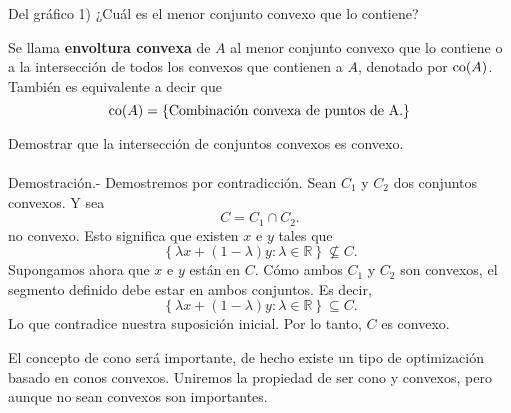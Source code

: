 \begin{paracol}{2}
Del gráfico 1) ¿Cuál es el menor conjunto convexo que lo contiene?
\begin{center}
\end{center}

\begin{def.}
    Se llama \textbf{envoltura convexa} de $A$ al menor conjunto convexo que lo contiene o a la intersección de todos los convexos que contienen a $A$, denotado por $\mathop{\mbox{\normalfont co}}\nolimits(A)$.
    También es equivalente a decir que
    $$\mathop{\mbox{\normalfont co}}\nolimits(A)=\left\{\mbox{Combinación convexa de puntos de A.}\right\}$$
\end{def.}

{\color{blue}
\begin{ejer}
    Demostrar que la intersección de conjuntos convexos es convexo.\\\\
	Demostración.-\; Demostremos por contradicción. Sean $C_1$ y $C_2$ dos conjuntos convexos. Y sea 
	$$C=C_1\cap C_2.$$
	no convexo. Esto significa que existen $x$ e $y$ tales que 
	$$\left\{\lambda x + (1-\lambda)y:\lambda\in \mathbb{R}\right\}\not\subseteq C.$$ 
	Supongamos ahora que $x$ e $y$ están en $C$. Cómo ambos $C_1$ y $C_2$ son convexos, el segmento definido debe estar en ambos conjuntos. Es decir,
	$$\left\{\lambda x + (1-\lambda)y:\lambda\in \mathbb{R}\right\}\subseteq C.$$ 
	Lo que contradice nuestra suposición inicial. Por lo tanto, $C$ es convexo.
\end{ejer}
}

\begin{tcolorbox}[colframe=white]
El concepto de cono será importante, de hecho existe un tipo de optimización basado en conos convexos. Uniremos la propiedad de ser cono y convexos, pero aunque no sean convexos son importantes.
\end{tcolorbox}


\end{paracol}
